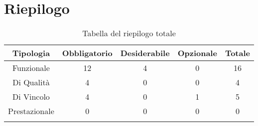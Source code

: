 \section{Riepilogo}

\begin{center}
  \centering
  \begin{longtable}{|c|c|c|c|c|}
    \hline
    \rowcolor[HTML]{036400}
    {\color[HTML]{FFFFFF} \textbf{Tipologia}} & {\color[HTML]{FFFFFF} \textbf{Obbligatorio}} & {\color[HTML]{FFFFFF} \textbf{Desiderabile}} & {\color[HTML]{FFFFFF} \textbf{Opzionale}}  & {\color[HTML]{FFFFFF} \textbf{Totale}} \\ \hline
    \rowcolor[HTML]{EFEFEF}
    Funzionale & 12 & 4 & 0 & 16 \\ \hline
    \rowcolor[HTML]{C0C0C0}
    Di Qualità & 4 & 0 & 0 & 4 \\ \hline
    \rowcolor[HTML]{EFEFEF}
    Di Vincolo & 4 & 0 & 1 & 5 \\ \hline
    \rowcolor[HTML]{C0C0C0}
    Prestazionale & 0 & 0 & 0 & 0 \\ \hline

    \caption{Tabella del riepilogo totale}
  \end{longtable}
\end{center}
